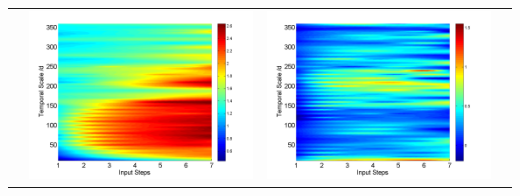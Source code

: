 \documentclass[draft,wrr]{AGUTeX}
\begin{document}
\begin{article}
\begin{table}[H]
\begin{tabular}{cccc}
&\begin{minipage}{.3\textwidth}\includegraphics[width=\linewidth]{resultgraph/11532500p.png}\end{minipage}
&\begin{minipage}{.3\textwidth}\includegraphics[width=\linewidth]{resultgraph/11532500diff_ep.png}\end{minipage}

\end{tabular}
\end{table}
\end{article}
\end{document}
